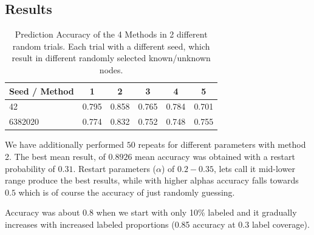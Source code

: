 \documentclass[a4paper,10pt]{article}
\theoremstyle{definition}
\theoremstyle{remark}
\theoremstyle{plain}
\begin{document}
\subsection{Results}

\begin{table}[!htb]
\caption{Prediction Accuracy of the 4 Methods in 2 different random
trials. Each trial with a different seed, which result in different randomly
selected known/unknown nodes.} 
\begin{center}
\begin{tabular}{ | l | c | c | c | c | c | }
\hline
Seed / Method & 1 & 2 & 3 & 4 & 5\\
\hline
42 & 0.795 & 0.858 & 0.765 &
0.784 & 0.701\\
6382020 & 0.774 & 0.832 & 0.752 & 0.748 & 0.755\\
\hline
\end{tabular}
\label{table:results_5_prediction_methods}
\end{center}
\end{table}

We have additionally performed $50$ repeats for different parameters
with method 2.
The best mean result, of $0.8926$ mean accuracy was obtained with a
restart probability of $0.31$. Restart parameters ($\alpha$) of $0.2-0.35$, lets
call it mid-lower range produce the best results, while with higher
alphas accuracy falls towards $0.5$ which is of course the accuracy of
just randomly guessing. 

Accuracy was about 0.8 when we start with only 10\% labeled and it
gradually increases with increased labeled proportions (0.85 accuracy at
0.3 label coverage).
\end{document}
